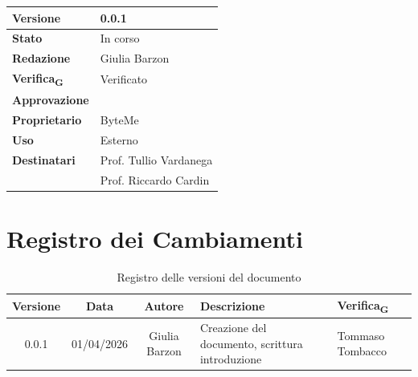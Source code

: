 \documentclass[11pt,a4paper]{article}
\newcommand{\gls}[1]{#1\textsubscript{G}}
\begin{document}
\begin{titlepage}
    \begin{table}[H]
        \centering
        \begin{tabular}{|l|p{5cm}|}
            \hline
            \textbf{Versione} & 0.0.1 \\
            \hline
            \textbf{Stato} & In corso\\
            \hline
            \textbf{Redazione} & Giulia Barzon\\
            \hline
            \textbf{\gls{Verifica}} & Verificato \\
            \hline
            \textbf{Approvazione} & \\
            \hline
            \textbf{Proprietario} & ByteMe \\
            \hline
            \textbf{Uso} & Esterno \\
            \hline
            \textbf{Destinatari} & Prof. Tullio Vardanega \\ & Prof. Riccardo Cardin \\
            \hline
        \end{tabular}
    \end{table}
    
    \vfill
\end{titlepage}

\thispagestyle{empty}
\section*{Registro dei Cambiamenti}

\begin{table}[H]
    \centering
    \begin{tabular}{|c|c|c|>{\raggedright\arraybackslash}p{}|p{}|}
        \hline
        \textbf{Versione} & \textbf{Data} & \textbf{Autore} & \textbf{Descrizione} & \textbf{\gls{Verifica}} \\
        \hline
        0.0.1 & 01/04/2026 & Giulia Barzon & Creazione del documento, scrittura introduzione & Tommaso Tombacco \\
        \hline
    \end{tabular}
    \caption{Registro delle versioni del documento}
    \label{tab:versionamento}
\end{table}

\newpage

\tableofcontents
\thispagestyle{empty}
\newpage

\setcounter{page}{1}
\end{document}
